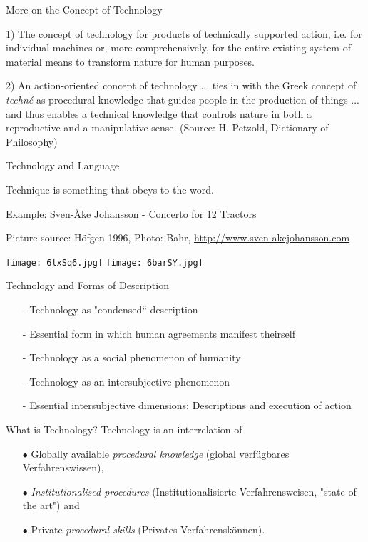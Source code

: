 \documentclass{beamer}
\begin{document}
\begin{frame}{More on the Concept of Technology}

1) The concept of technology for products of technically supported action,
i.e. for individual machines or, more comprehensively, for the entire existing
system of material means to transform nature for human purposes.

2) An action-oriented concept of technology ... ties in with the Greek concept
of \emph{techné} as procedural knowledge that guides people in the production
of things ... and thus enables a technical knowledge that controls nature in
both a reproductive and a manipulative sense. (Source: H. Petzold, Dictionary
of Philosophy)

\end{frame}

\begin{frame}{Technology and Language}

Technique is something that obeys to the word.

Example: Sven-Åke Johansson - Concerto for 12 Tractors

Picture source: Höfgen 1996, Photo: Bahr,
\url{http://www.sven-akejohansson.com}

\begin{center}
  \texttt{[image: 6lxSq6.jpg]}\hfill
  \texttt{[image: 6barSY.jpg]}
\end{center}

\end{frame}

\begin{frame}{Technology and Forms of Description}
  \begin{itemize}
  \item[-] Technology as "condensed“ description
  \item[-] Essential form in which human agreements manifest theirself
  \item[-] Technology as a social phenomenon of humanity
  \item[-] Technology as an intersubjective phenomenon
  \item[-] Essential intersubjective dimensions: Descriptions and execution of
    action
  \end{itemize}
  \begin{block}{What is Technology?} 
    Technology is an interrelation of
    \begin{itemize}
    \item[$\bullet$] Globally available \emph{procedural knowledge}
      (global verfügbares Verfahrenswissen), 
    \item[$\bullet$] \emph{Institutionalised procedures} (Institutionalisierte
      Verfahrens\-weisen, "state of the art") and
    \item[$\bullet$] Private \emph{procedural skills} (Privates
      Verfahrenskönnen).
    \end{itemize}
  \end{block}
\end{frame}
\end{document}
